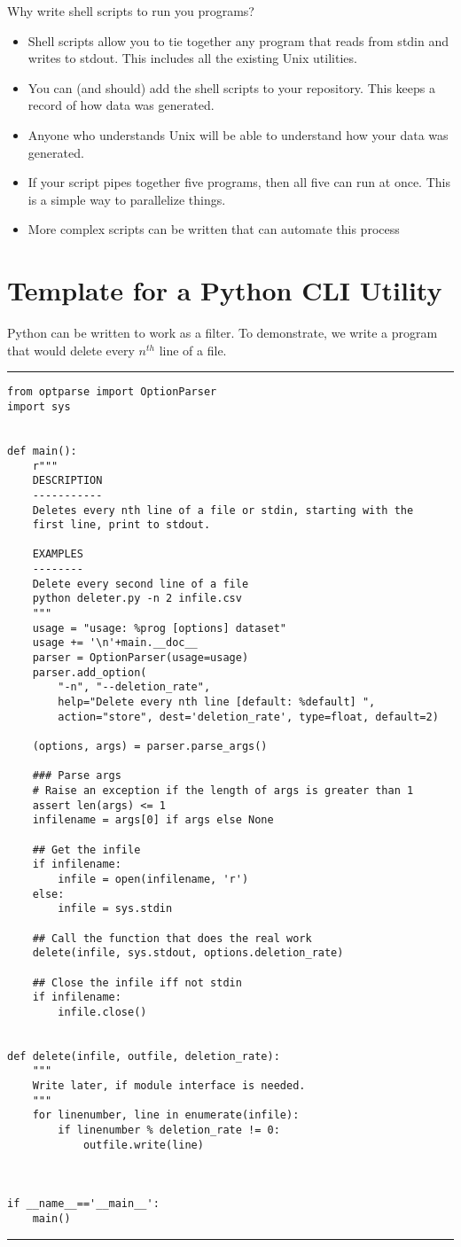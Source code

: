 Why write shell scripts to run you programs?  
\begin{itemize}
  \item Shell scripts allow you to tie together any program that reads from stdin and writes to stdout.  This includes all the existing Unix utilities.
  \item You can (and should) add the shell scripts to your repository.  This keeps a record of how data was generated.
  \item Anyone who understands Unix will be able to understand how your data was generated.
  \item If your script pipes together five programs, then all five can run at once.  This is a simple way to parallelize things.
  \item More complex scripts can be written that can automate this process
\end{itemize}

\section{Template for a Python CLI Utility}
Python can be written to work as a filter.  To demonstrate, we write a program that would delete every $n^{th}$ line of a file.

\rule{\textwidth}{2pt}
\begin{verbatim}
from optparse import OptionParser
import sys


def main():
    r"""
    DESCRIPTION
    -----------
    Deletes every nth line of a file or stdin, starting with the
    first line, print to stdout.

    EXAMPLES
    --------
    Delete every second line of a file
    python deleter.py -n 2 infile.csv
    """
    usage = "usage: %prog [options] dataset"
    usage += '\n'+main.__doc__
    parser = OptionParser(usage=usage)
    parser.add_option(
        "-n", "--deletion_rate",
        help="Delete every nth line [default: %default] ",
        action="store", dest='deletion_rate', type=float, default=2)

    (options, args) = parser.parse_args()

    ### Parse args
    # Raise an exception if the length of args is greater than 1
    assert len(args) <= 1
    infilename = args[0] if args else None

    ## Get the infile
    if infilename:
        infile = open(infilename, 'r')
    else:
        infile = sys.stdin

    ## Call the function that does the real work
    delete(infile, sys.stdout, options.deletion_rate)

    ## Close the infile iff not stdin
    if infilename:
        infile.close()


def delete(infile, outfile, deletion_rate):
    """
    Write later, if module interface is needed.
    """
    for linenumber, line in enumerate(infile):
        if linenumber % deletion_rate != 0:
            outfile.write(line)


  
if __name__=='__main__':
    main()
\end{verbatim}
\rule{\textwidth}{2pt}

